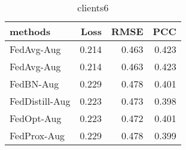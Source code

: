 \begin{table}
\caption{clients6}
\begin{tabular}{lrrr}
\toprule
methods & Loss & RMSE & PCC \\
\midrule
FedAvg-Aug & 0.214 & 0.463 & 0.423 \\
FedAvg-Aug & 0.214 & 0.463 & 0.423 \\
FedBN-Aug & 0.229 & 0.478 & 0.401 \\
FedDistill-Aug & 0.223 & 0.473 & 0.398 \\
FedOpt-Aug & 0.223 & 0.472 & 0.401 \\
FedProx-Aug & 0.229 & 0.478 & 0.399 \\
\bottomrule
\end{tabular}
\end{table}
